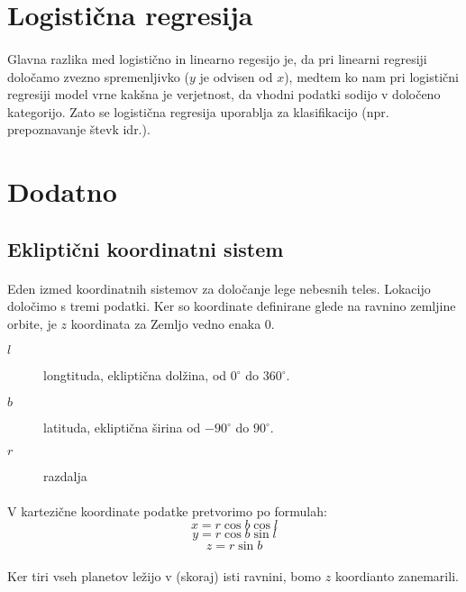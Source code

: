 \documentclass[a4paper, 12pt]{article}
\begin{document}
	\section*{Logistična regresija}
	\paragraph{}
	Glavna razlika med logistično in linearno regesijo je, da pri linearni regresiji določamo zvezno spremenljivko ($y$ je odvisen od $x$), medtem ko nam pri logistični regresiji model vrne kakšna je verjetnost, da vhodni podatki sodijo v določeno kategorijo.
	Zato se logistična regresija uporablja za klasifikacijo (npr. prepoznavanje števk idr.).


	\section*{Dodatno}
	\subsection*{Ekliptični koordinatni sistem}
	\paragraph{}
	Eden izmed koordinatnih sistemov za določanje lege nebesnih teles. Lokacijo določimo s tremi podatki. Ker so koordinate definirane glede na ravnino zemljine orbite, je $z$ koordinata za Zemljo vedno enaka 0.
	\begin{description}
		\item[$l$] longtituda, ekliptična dolžina, od $0^\circ$ do $360^\circ$.
		\item[$b$] latituda, ekliptična širina od $-90^\circ$ do $90^\circ$.
		\item[$r$] razdalja
	\end{description}

	\paragraph{}
	V kartezične koordinate podatke pretvorimo po formulah:
	$$x = r \cos b \cos l$$
	$$y = r \cos b \sin l$$
	$$z = r \sin b$$

	\paragraph{}
	Ker tiri vseh planetov ležijo v (skoraj) isti ravnini, bomo $z$ koordianto zanemarili.
\end{document}
